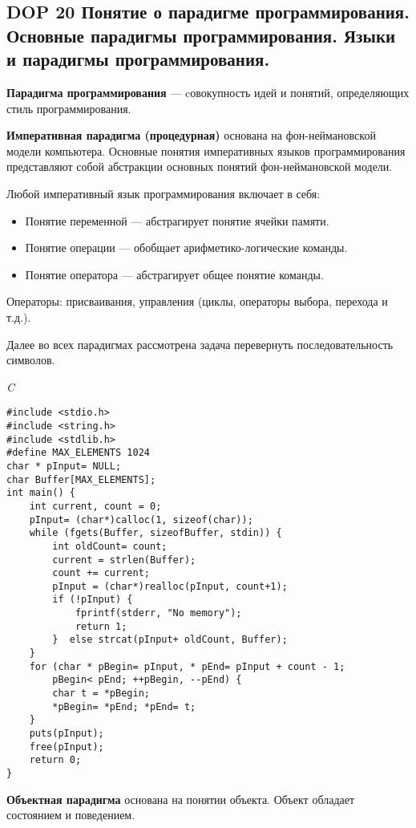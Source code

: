 \subsection{DOP 20 Понятие  о  парадигме  программирования.  Основные  парадигмы  программирования.  Языки  и  парадигмы программирования.}

\textbf{Парадигма программирования} --- cовокупность идей и понятий, определяющих стиль программирования.

\textbf{Императивная парадигма (процедурная)} основана на фон-неймановской модели компьютера.
Основные понятия императивных языков программирования представляют собой абстракции основных понятий фон-неймановской модели.

Любой императивный язык программирования включает в себя:
\begin{itemize}
    \item Понятие переменной --- абстрагирует понятие ячейки памяти.
    \item Понятие операции --- обобщает арифметико-логические команды.
    \item Понятие оператора --- абстрагирует общее понятие команды.
\end{itemize}

Операторы: присваивания, управления (циклы, операторы выбора, перехода и т.д.).

Далее во всех парадигмах рассмотрена задача перевернуть последовательность символов.

\textit{C}
\begin{lstlisting}[basicstyle=\ttfamily\small, frame=single]
#include <stdio.h>
#include <string.h>
#include <stdlib.h>
#define MAX_ELEMENTS 1024
char * pInput= NULL;
char Buffer[MAX_ELEMENTS];
int main() {
    int current, count = 0;
    pInput= (char*)calloc(1, sizeof(char));
    while (fgets(Buffer, sizeofBuffer, stdin)) {
        int oldCount= count;
        current = strlen(Buffer);
        count += current;
        pInput = (char*)realloc(pInput, count+1);
        if (!pInput) {
            fprintf(stderr, "No memory");
            return 1;
        }  else strcat(pInput+ oldCount, Buffer);
    }
    for (char * pBegin= pInput, * pEnd= pInput + count - 1;
        pBegin< pEnd; ++pBegin, --pEnd) {
        char t = *pBegin;
        *pBegin= *pEnd; *pEnd= t;
    }
    puts(pInput);
    free(pInput);
    return 0;
}
    \end{lstlisting}

\bigbreak
\textbf{Объектная парадигма} основана на понятии объекта.
Объект обладает состоянием и поведением.

